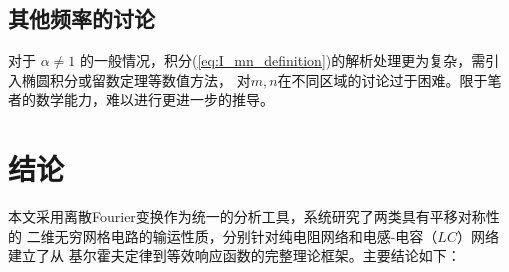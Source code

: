 \documentclass{article} %
\begin{document}
\subsection{其他频率的讨论}

对于 $\alpha \neq 1$ 的一般情况，积分(\ref{eq:I_mn_definition})的解析处理更为复杂，需引入椭圆积分或留数定理等数值方法，
对$m,n$在不同区域的讨论过于困难。限于笔者的数学能力，难以进行更进一步的推导。


\section{结论}

本文采用离散Fourier变换作为统一的分析工具，系统研究了两类具有平移对称性的
二维无穷网格电路的输运性质，分别针对纯电阻网络和电感-电容（$LC$）网络建立了从
基尔霍夫定律到等效响应函数的完整理论框架。主要结论如下：
 
\end{document}
